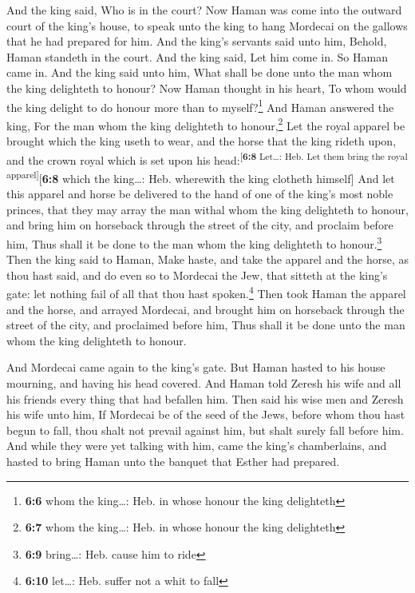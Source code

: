  And the king said, Who is in the court? Now Haman was
come into the outward court of the king's house, to speak unto the king
to hang Mordecai on the gallows that he had prepared for him.
 And the king's servants said unto him, Behold, Haman
standeth in the court. And the king said, Let him come in.
 So Haman came in. And the king said unto him, What shall
be done unto the man whom the king delighteth to honour? Now Haman
thought in his heart, To whom would the king delight to do honour more
than to myself?\footnote{\textbf{6:6} whom the king\ldots: Heb. in whose
  honour the king delighteth}  And Haman answered the
king, For the man whom the king delighteth to honour,\footnote{\textbf{6:7}
  whom the king\ldots: Heb. in whose honour the king delighteth}
 Let the royal apparel be brought which the king useth to
wear, and the horse that the king rideth upon, and the crown royal which
is set upon his head:\textsuperscript{{[}\textbf{6:8} Let\ldots: Heb.
Let them bring the royal apparel{]}}{[}\textbf{6:8} which the
king\ldots: Heb. wherewith the king clotheth himself{]} 
And let this apparel and horse be delivered to the hand of one of the
king's most noble princes, that they may array the man withal whom the
king delighteth to honour, and bring him on horseback through the street
of the city, and proclaim before him, Thus shall it be done to the man
whom the king delighteth to honour.\footnote{\textbf{6:9} bring\ldots:
  Heb. cause him to ride}  Then the king said to Haman,
Make haste, and take the apparel and the horse, as thou hast said, and
do even so to Mordecai the Jew, that sitteth at the king's gate: let
nothing fail of all that thou hast spoken.\footnote{\textbf{6:10}
  let\ldots: Heb. suffer not a whit to fall}  Then took
Haman the apparel and the horse, and arrayed Mordecai, and brought him
on horseback through the street of the city, and proclaimed before him,
Thus shall it be done unto the man whom the king delighteth to honour.

 And Mordecai came again to the king's gate. But Haman
hasted to his house mourning, and having his head covered.
 And Haman told Zeresh his wife and all his friends every
thing that had befallen him. Then said his wise men and Zeresh his wife
unto him, If Mordecai be of the seed of the Jews, before whom thou hast
begun to fall, thou shalt not prevail against him, but shalt surely fall
before him.  And while they were yet talking with him,
came the king's chamberlains, and hasted to bring Haman unto the banquet
that Esther had prepared.

